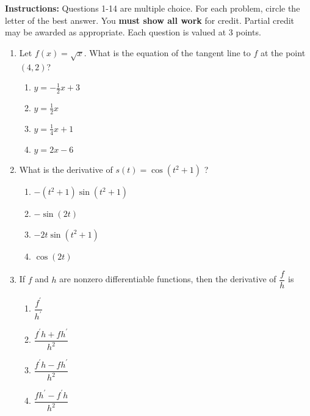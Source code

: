 \documentclass{article}
\begin{document}
\pagestyle{fancy}
\fancyhf{}
\renewcommand{\footrulewidth}{0.4pt}

\noindent
\textbf{Instructions:} Questions 1-14 are multiple choice. For each problem, circle the letter of the best answer.
You \textbf{must show all work} for credit. Partial credit may be awarded as appropriate. Each question is
valued at 3 points.
\begin{enumerate}
	\itemsep2em
	\item
	\begin{minipage}[t]{\linewidth}
		Let \(f(x)=\sqrt{x}\). What is the equation of the tangent line to \(f\)
at the point \((4,2)\)?\\[0.1em]
		\begin{enumerate}
		\itemsep1em
			\item  $y=-\frac{1}{2} x+3$
			\item  $y=\frac{1}{2} x$
			\item  $y=\frac{1}{4} x+1$
			\item  $y=2 x-6$
		\end{enumerate}
	\end{minipage}
	\item
	\begin{minipage}[t]{\linewidth}
		What is the derivative of \(s(t)=\cos \left(t^2 + 1\right)\) ?\\[0.1em]
		\begin{enumerate}
		\itemsep1em
			\item  $-(t^2+1)\sin(t^2+1)$
			\item  $-\sin(2t)$
			\item  $-2t\sin(t^2+1)$
			\item  $\cos(2t)$
		\end{enumerate}
	\end{minipage}
	\item
	\begin{minipage}[t]{\linewidth}
		If \(f\) and \(h\) are nonzero differentiable functions, then the
derivative of \(\dfrac{f}{h}\) is\\[0.1em]
		\begin{enumerate}
		\itemsep1em
			\item  $\dfrac{f^{\prime}}{h^{\prime}}$
			\item  $\dfrac{f^{\prime} h + f h^{\prime}}{h^2}$
			\item  $\dfrac{f^{\prime} h - f h^{\prime}}{h^2}$
			\item  $\dfrac{f h^{\prime} - f^{\prime} h}{h^{2}}$
		\end{enumerate}

\end{minipage}
\end{enumerate}
\end{document}
